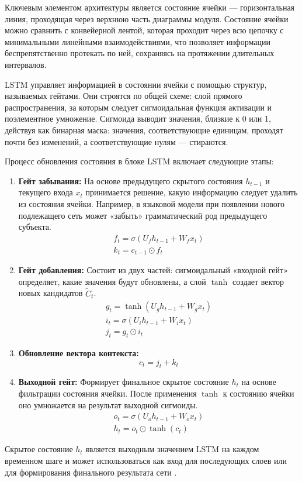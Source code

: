 \documentclass[coursework]{SCWorks}
\begin{document}
    Ключевым элементом архитектуры является состояние ячейки — горизонтальная линия,
    проходящая через верхнюю часть диаграммы модуля.
    Состояние ячейки можно сравнить с конвейерной лентой,
    которая проходит через всю цепочку с минимальными линейными взаимодействиями,
    что позволяет информации беспрепятственно протекать по ней, сохраняясь на протяжении длительных интервалов.

    LSTM управляет информацией в состоянии ячейки с помощью структур, называемых гейтами.
    Они строятся по общей схеме: слой прямого распространения,
    за которым следует сигмоидальная функция активации и поэлементное умножение.
    Сигмоида выводит значения, близкие к 0 или 1, действуя как бинарная маска:
    значения, соответствующие единицам, проходят почти без изменений, а соответствующие нулям — стираются.

    Процесс обновления состояния в блоке LSTM включает следующие этапы:

    \begin{enumerate}
        \item \textbf{Гейт забывания:} На основе предыдущего скрытого состояния $h_{t-1}$ и текущего входа $x_t$ принимается решение, какую информацию следует удалить из состояния ячейки.
        Например, в языковой модели при появлении нового подлежащего сеть может «забыть» грамматический род предыдущего субъекта.
        \begin{gather*}
            f_t = \sigma (U_f h_{t-1} + W_f x_t)\\
            k_t = c_{t-1} \odot f_t
        \end{gather*}
        \item \textbf{Гейт добавления:} Состоит из двух частей: сигмоидальный «входной гейт» определяет, какие значения будут обновлены, а слой $\tanh$ создает вектор новых кандидатов $\tilde{C}_t$.
        \begin{gather*}
            g_t = \tanh(U_g h_{t-1} + W_g x_t)\\
            i_t = \sigma (U_i h_{t-1} + W_i x_t)\\
            j_t = g_t \odot i_t
        \end{gather*}
        \item \textbf{Обновление вектора контекста:}
        \[c_t = j_t + k_t\]
        \item \textbf{Выходной гейт:} Формирует финальное скрытое состояние $h_t$ на основе фильтрации состояния ячейки. После применения $\tanh$ к состоянию ячейки оно умножается на результат выходной сигмоиды.
        \begin{gather*}
            o_t = \sigma (U_o h_{t-1} + W_o x_t)\\
            h_t = o_t \odot \tanh(c_t)
        \end{gather*}
    \end{enumerate}
    Скрытое состояние $h_t$ является выходным значением LSTM на каждом временном шаге
    и может использоваться как вход для последующих слоев или для формирования финального результата
    сети \cite{jm3}.
\end{document}
